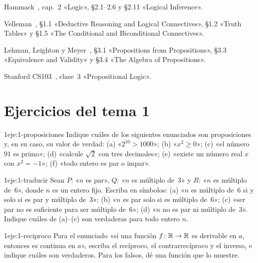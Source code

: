 \begin{lecturas}
\item Hammack~\cite{hammack}, cap.~2 «Logic», §2.1–2.6 y §2.11 «Logical Inference».
\item Velleman~\cite{velleman}, §1.1 «Deductive Reasoning and Logical Connectives», §1.2 «Truth Tables» y §1.5 «The Conditional and Biconditional Connectives».
\item Lehman, Leighton y Meyer~\cite{mcs}, §3.1 «Propositions from Propositions», §3.3 «Equivalence and Validity» y §3.4 «The Algebra of Propositions».
\item Stanford CS103~\cite{cs103}, clase~3 «Propositional Logic».
\end{lecturas}

\section*{Ejercicios del tema 1}

\begin{ejercicio}{1}{eje:1-proposiciones}
Indique cuáles de los siguientes enunciados son proposiciones y, en su caso, su valor de verdad: (a) «$2^{10}>1000$»; (b) «$x^{2}\ge 0$»; (c) «el número $91$ es primo»; (d) «calcule $\sqrt{2}$ con tres decimales»; (e) «existe un número real $x$ con $x^{2}=-1$»; (f) «todo entero es par o impar».
\end{ejercicio}

\begin{ejercicio}{1}{eje:1-traducir}
Sean $P$: «$n$ es par», $Q$: «$n$ es múltiplo de~3» y $R$: «$n$ es múltiplo de~6», donde $n$ es un entero fijo. Escriba en símbolos: (a) «$n$ es múltiplo de~6 si y solo si es par y múltiplo de~3»; (b) «$n$ es par solo si es múltiplo de~6»; (c) «ser par no es suficiente para ser múltiplo de~6»; (d) «$n$ no es par ni múltiplo de~3». Indique cuáles de (a)–(c) son verdaderas para todo entero $n$.
\end{ejercicio}

\begin{ejercicio}{1}{eje:1-reciproco}
Para el enunciado «si una función $f\colon\mathbb{R}\to\mathbb{R}$ es derivable en $a$, entonces es continua en $a$», escriba el recíproco, el contrarrecíproco y el inverso, e indique cuáles son verdaderos. Para los falsos, dé una función que lo muestre.
\end{ejercicio}

